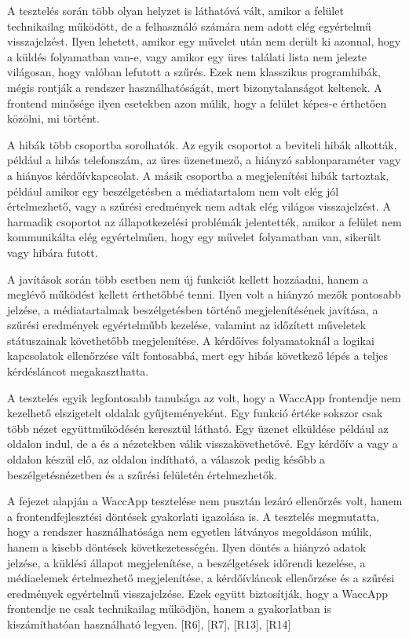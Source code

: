 A tesztelés során több olyan helyzet is láthatóvá vált, amikor a felület technikailag működött, de a felhasználó számára nem adott elég egyértelmű visszajelzést. Ilyen lehetett, amikor egy művelet után nem derült ki azonnal, hogy a küldés folyamatban van-e, vagy amikor egy üres találati lista nem jelezte világosan, hogy valóban lefutott a szűrés. Ezek nem klasszikus programhibák, mégis rontják a rendszer használhatóságát, mert bizonytalanságot keltenek. A frontend minősége ilyen esetekben azon múlik, hogy a felület képes-e érthetően közölni, mi történt.

A hibák több csoportba sorolhatók. Az egyik csoportot a beviteli hibák alkották, például a hibás telefonszám, az üres üzenetmező, a hiányzó sablonparaméter vagy a hiányos kérdőívkapcsolat. A másik csoportba a megjelenítési hibák tartoztak, például amikor egy beszélgetésben a médiatartalom nem volt elég jól értelmezhető, vagy a szűrési eredmények nem adtak elég világos visszajelzést. A harmadik csoportot az állapotkezelési problémák jelentették, amikor a felület nem kommunikálta elég egyértelműen, hogy egy művelet folyamatban van, sikerült vagy hibára futott.

A javítások során több esetben nem új funkciót kellett hozzáadni, hanem a meglévő működést kellett érthetőbbé tenni. Ilyen volt a hiányzó mezők pontosabb jelzése, a médiatartalmak beszélgetésben történő megjelenítésének javítása, a szűrési eredmények egyértelműbb kezelése, valamint az időzített műveletek státuszainak követhetőbb megjelenítése. A kérdőíves folyamatoknál a logikai kapcsolatok ellenőrzése vált fontosabbá, mert egy hibás következő lépés a teljes kérdésláncot megakaszthatta.

A tesztelés egyik legfontosabb tanulsága az volt, hogy a WaccApp frontendje nem kezelhető elszigetelt oldalak gyűjteményeként. Egy funkció értéke sokszor csak több nézet együttműködésén keresztül látható. Egy üzenet elküldése például az  oldalon indul, de a  és a  nézetekben válik visszakövethetővé. Egy kérdőív a  vagy a  oldalon készül elő, az  oldalon indítható, a válaszok pedig később a beszélgetésnézetben és a  szűrési felületén értelmezhetők.

A fejezet alapján a WaccApp tesztelése nem pusztán lezáró ellenőrzés volt, hanem a frontendfejlesztési döntések gyakorlati igazolása is. A tesztelés megmutatta, hogy a rendszer használhatósága nem egyetlen látványos megoldáson múlik, hanem a kisebb döntések következetességén. Ilyen döntés a hiányzó adatok jelzése, a küldési állapot megjelenítése, a beszélgetések időrendi kezelése, a médiaelemek értelmezhető megjelenítése, a kérdőívláncok ellenőrzése és a szűrési eredmények egyértelmű visszajelzése. Ezek együtt biztosítják, hogy a WaccApp frontendje ne csak technikailag működjön, hanem a gyakorlatban is kiszámíthatóan használható legyen. [R6], [R7], [R13], [R14] 
